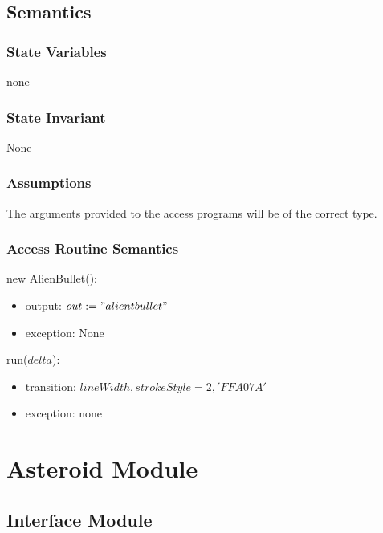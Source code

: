 \documentclass[12pt]{article}
\begin{document}
\subsection* {Semantics}

\subsubsection* {State Variables}
none
\subsubsection* {State Invariant}
None

\subsubsection* {Assumptions}

The arguments provided to the access programs will be of the correct type.

\subsubsection* {Access Routine Semantics}

\noindent new AlienBullet():
\begin{itemize}
\item output: $out := "alientbullet"$
\item exception: None
\end{itemize}

\noindent run($delta$):
\begin{itemize}
\item transition: $lineWidth,strokeStyle = 2, 'FFA07A'$
\item exception: none
\end{itemize}

\newpage














\section* {Asteroid Module}

\subsection*{Interface Module}
\end{document}
